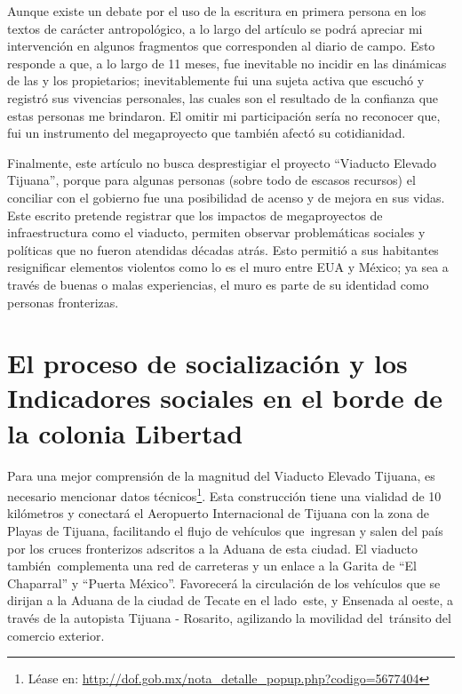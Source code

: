 \documentclass[
  spanish,
  11pt,
  a4paper,
]{scrbook}
\begin{document}
Aunque existe un debate por el uso de la escritura en primera persona en
los textos de carácter antropológico, a lo largo del artículo se podrá
apreciar mi intervención en algunos fragmentos que corresponden al
diario de campo. Esto responde a que, a lo largo de 11 meses, fue
inevitable no incidir en las dinámicas de las y los propietarios;
inevitablemente fui una sujeta activa que escuchó y registró sus
vivencias personales, las cuales son el resultado de la confianza que
estas personas me brindaron. El omitir mi participación sería no
reconocer que, fui un instrumento del megaproyecto que también afectó su
cotidianidad.

Finalmente, este artículo no busca desprestigiar el proyecto ``Viaducto
Elevado Tijuana'', porque para algunas personas (sobre todo de escasos
recursos) el conciliar con el gobierno fue una posibilidad de acenso y
de mejora en sus vidas. Este escrito pretende registrar que los impactos
de megaproyectos de infraestructura como el viaducto, permiten observar
problemáticas sociales y políticas que no fueron atendidas décadas
atrás. Esto permitió a sus habitantes resignificar elementos violentos
como lo es el muro entre EUA y México; ya sea a través de buenas o malas
experiencias, el muro es parte de su identidad como personas
fronterizas.

\section*{El proceso de socialización y los Indicadores sociales en el
borde de la colonia
Libertad}\label{el-proceso-de-socializaciuxf3n-y-los-indicadores-sociales-en-el-borde-de-la-colonia-libertadcap6_5}


Para una mejor comprensión de la magnitud del Viaducto Elevado Tijuana,
es necesario mencionar datos técnicos\footnote{Léase en:
  \url{http://dof.gob.mx/nota_detalle_popup.php?codigo=5677404}}. Esta
construcción tiene una vialidad de 10 kilómetros y conectará el
Aeropuerto Internacional de Tijuana con la zona de Playas de Tijuana,
facilitando el flujo de vehículos que~ingresan y salen del país por los
cruces fronterizos adscritos a la Aduana de esta ciudad. El viaducto
también~complementa una red de carreteras y un enlace a la Garita de
``El Chaparral'' y ``Puerta México''. Favorecerá la circulación de los
vehículos que se dirijan a la Aduana de la ciudad de Tecate en el
lado~este, y Ensenada al oeste, a través de la autopista Tijuana -
Rosarito, agilizando la movilidad del~tránsito del comercio exterior.
\end{document}
